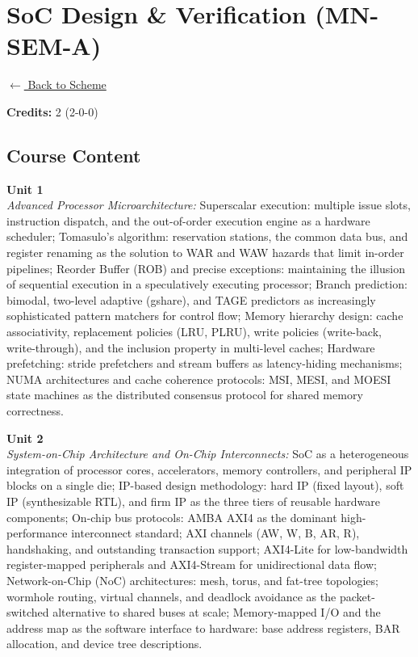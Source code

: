 \section*{SoC Design \& Verification (MN-SEM-A)}
\label{minor:SEM_L2}

\noindent \small{\hyperref[main:scheme]{$\leftarrow$ Back to Scheme}} \vspace{0.5cm}

\noindent \textbf{Credits:} 2 (2-0-0)

\subsection*{Course Content}
\noindent\textbf{Unit 1} \\
\textit{Advanced Processor Microarchitecture:} Superscalar execution: multiple issue slots, instruction dispatch, and the out-of-order execution engine as a hardware scheduler; Tomasulo's algorithm: reservation stations, the common data bus, and register renaming as the solution to WAR and WAW hazards that limit in-order pipelines; Reorder Buffer (ROB) and precise exceptions: maintaining the illusion of sequential execution in a speculatively executing processor; Branch prediction: bimodal, two-level adaptive (gshare), and TAGE predictors as increasingly sophisticated pattern matchers for control flow; Memory hierarchy design: cache associativity, replacement policies (LRU, PLRU), write policies (write-back, write-through), and the inclusion property in multi-level caches; Hardware prefetching: stride prefetchers and stream buffers as latency-hiding mechanisms; NUMA architectures and cache coherence protocols: MSI, MESI, and MOESI state machines as the distributed consensus protocol for shared memory correctness.

\vspace{0.3cm}

\noindent\textbf{Unit 2} \\
\textit{System-on-Chip Architecture and On-Chip Interconnects:} SoC as a heterogeneous integration of processor cores, accelerators, memory controllers, and peripheral IP blocks on a single die; IP-based design methodology: hard IP (fixed layout), soft IP (synthesizable RTL), and firm IP as the three tiers of reusable hardware components; On-chip bus protocols: AMBA AXI4 as the dominant high-performance interconnect standard; AXI channels (AW, W, B, AR, R), handshaking, and outstanding transaction support; AXI4-Lite for low-bandwidth register-mapped peripherals and AXI4-Stream for unidirectional data flow; Network-on-Chip (NoC) architectures: mesh, torus, and fat-tree topologies; wormhole routing, virtual channels, and deadlock avoidance as the packet-switched alternative to shared buses at scale; Memory-mapped I/O and the address map as the software interface to hardware: base address registers, BAR allocation, and device tree descriptions.

